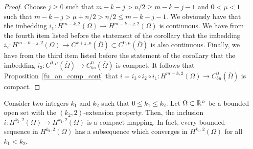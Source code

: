\begin{proof}
 Choose $j \geq 0$ such that $m-k -j >n/2 \geq m-k-j-1$ and
$0<\mu<1$ such that $m-k -j > \mu + n/2 > n/2 \leq m-k-j-1$.
We obviously have that the imbedding
$\displaystyle i_1 : H^{m-k,2}(\Omega) \to H^{m-k-j,2}(\Omega)$
is continuous.  We have from the fourth item listed before the
statement of the corollary that the imbedding
$\displaystyle i_2 : H^{m-k-j,2}(\Omega) \to
C^{k+j,\mu}(\overline{\Omega}) \subset C^{0,\mu}(\overline{\Omega})$
is also continuous.  Finally, we have from the third item 
listed before the statement of the corollary that the imbedding
$\displaystyle i_3 : C^{0,\mu}(\overline{\Omega})
\to C_{bu}^0(\overline{\Omega})$ is
compact.  It follows that Proposition~\ref{fu_an_comp_cont} that
$\displaystyle i = i_3 \circ i_2 \circ i_1:
H^{m-k,2}(\Omega) \to C^0_{bu}(\overline{\Omega})$ is
compact.
\end{proof}

\begin{theorem} \label{sob_rell_th}
Consider two integers $k_1$ and $k_2$ such that $0\leq k_1\leq k_2$.
Let $\Omega \subset \mathbb{R}^n$ be a bounded open set with the
$(k_2,2)$-extension property.  Then, the inclusion
$\displaystyle i:H^{k_2,2}(\Omega) \to H^{k_1,2}(\Omega)$ is a
compact mapping.  In fact, every bounded sequence in
$\displaystyle H^{k_2,2}(\Omega)$ has a subsequence which converges in
$\displaystyle H^{k_1,2}(\Omega)$ for all $k_1 < k_2$.
\end{theorem}

